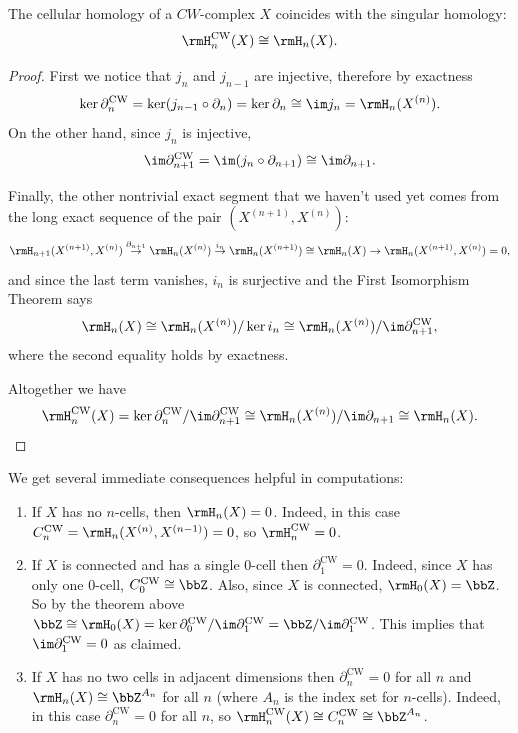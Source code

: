 \begin{thm}
    The cellular homology of a $CW$-complex $X$ coincides with the singular homology:
    \[\rmH_n^{\mathrm{CW}}(X)\cong \rmH_n(X).\]
\end{thm}
\begin{proof}
    First we notice that $j_{n}$ and $j_{n-1}$ are injective, therefore by exactness
    \[\ker\partial_n^{\mathrm{CW}}=\ker (j_{n-1}\circ\partial_n)=\ker\partial_{n}\cong \im j_{n}=\rmH_n(X^{(n)}).\]
    On the other hand, since $j_{n}$ is injective,
    \[\im \partial_{n+1}^{\mathrm{CW}}=\im (j_n\circ\partial_{n+1})\cong \im \partial_{n+1}. \]

    Finally, the other nontrivial exact segment that we haven't used yet comes from the long exact sequence of the pair $(X^{(n+1)},X^{(n)})$:
    \[\rmH_{n+1}(X^{(n+1)},X^{(n)})\overset{\partial_{n+1}}{\to} \rmH_n(X^{(n)})\overset{i_n}{\to}\rmH_n(X^{(n+1)})\cong \rmH_n(X)\to \rmH_{n}(X^{(n+1)},X^{(n)})=0,\]
    and since the last term vanishes, $i_n$ is surjective and the First Isomorphism Theorem says
    \[\rmH_n(X)\cong \rmH_n(X^{(n)})\slash \ker i_n\cong \rmH_n(X^{(n)})\slash \im \partial_{n+1}^{\mathrm{CW}},\]
    where the second equality holds by exactness.
    
    Altogether we have
    \[\rmH_n^{\mathrm{CW}}(X)=\ker \partial_n^{\mathrm{CW}}\slash \im \partial_{n+1}^{\mathrm{CW}}\cong \rmH_n(X^{(n)})\slash \im \partial_{n+1}\cong \rmH_n(X).\]
\end{proof}

\begin{rem}
    We get several immediate consequences helpful in computations:
    \begin{enumerate}
        \item If $X$ has no $n$-cells, then $\rmH_n(X)=0$. Indeed, in this case $C^{\mathrm{CW}}_n=\rmH_n(X^{(n)},X^{(n-1)})=0$, so $\rmH_n^{\mathrm{CW}}=0$.
        \item If $X$ is connected and has a single $0$-cell then $\partial_1^{\mathrm{CW}}=0$. Indeed, since $X$ has only one $0$-cell, $C^{\mathrm{CW}}_0\cong \bbZ$. Also, since $X$ is connected, $\rmH_0(X)=\bbZ$. So by the theorem above $\bbZ\cong \rmH_0(X)=\ker \partial_0^{\mathrm{CW}}\slash \im\partial_1^{\mathrm{CW}}=\bbZ\slash \im\partial_1^{\mathrm{CW}}$. This implies that $\im \partial_1^{\mathrm{CW}}=0$ as claimed.
        \item If $X$ has no two cells in adjacent dimensions then $\partial_n^{\mathrm{CW}}=0$ for all $n$ and $\rmH_n(X)\cong \bbZ^{A_n}$ for all $n$ (where $A_n$ is the index set for $n$-cells). Indeed, in this case $\partial_n^{\mathrm{CW}}=0$ for all $n$, so $\rmH_n^{\mathrm{CW}}(X)\cong C_n^{\mathrm{CW}}\cong \bbZ^{A_n}$.
    \end{enumerate}
\end{rem}

